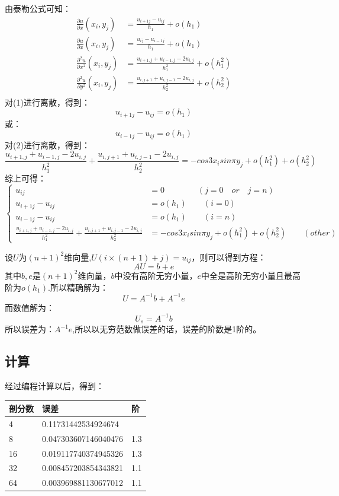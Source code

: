 \documentclass[12pt,a4paper]{article}
\begin{document}
由泰勒公式可知：
\begin{align*}
\frac{\partial u}{\partial x} (x_i,y_j)&=\frac{u_{i+1j}-u_{ij}}{h_1}+o(h_1)\\
\frac{\partial u}{\partial x} (x_i,y_j)&=\frac{u_{ij}-u_{i-1j}}{h_1}+o(h_1)\\
\frac{\partial^2 u}{\partial x^2}(x_i,y_j)&=\frac{u_{i+1,j}+u_{i-1,j}-2u_{i,j}}{h_1^2}+o(h_1^2)\\
\frac{\partial^2 u}{\partial y^2}(x_i,y_j)&=\frac{u_{i,j+1}+u_{i,j-1}-2u_{i,j}}{h_2^2}+o(h_2^2)\\
\end{align*}
对(1)进行离散，得到：
$$
u_{i+1j}-u_{ij}=o(h_1)
$$
或：
$$
u_{i-1j}-u_{ij}=o(h_1)
$$
对(2)进行离散，得到：
$$
\frac{u_{i+1,j}+u_{i-1,j}-2u_{i,j}}{h_1^2}+\frac{u_{i,j+1}+u_{i,j-1}-2u_{i,j}}{h_2^2}=-cos3x_isin\pi y_j+o(h_1^2)+o(h_2^2)
$$
综上可得：
\begin{equation}
\left\{
\begin{aligned}
u_{ij}&=0\qquad \qquad(j=0\quad or \quad j=n)\\
u_{i+1j}-u_{ij}&=o(h_1) \qquad (i=0)\\
u_{i-1j}-u_{ij}&=o(h_1) \qquad( i=n)\\
\frac{u_{i+1,j}+u_{i-1,j}-2u_{i,j}}{h_1^2}+\frac{u_{i,j+1}+u_{i,j-1}-2u_{i,j}}{h_2^2}&=-cos3x_isin\pi y_j+o(h_1^2)+o(h_2^2)\qquad (other)
\end{aligned}
\end{equation}

设$U$为$(n+1)^2$维向量,$U(i\times(n+1)+j)=u_{ij}$，则可以得到方程：
$$
AU=b+e
$$
其中$b,e$是$(n+1)^2$维向量，$b$中没有高阶无穷小量，$e$中全是高阶无穷小量且最高阶为$o(h_1)$.所以精确解为：
$$
U=A^{-1}b+A^{-1}e
$$
而数值解为：
$$
U_s=A^{-1}b
$$
所以误差为：$A^{-1}e$,所以以无穷范数做误差的话，误差的阶数是1阶的。

\subsection{计算}
经过编程计算以后，得到：

\begin{tabular}{l|l|l}
\hline

剖分数 & 误差 & 阶\\
\hline
4 & 0.11731442534924674 &{}\\
\hline
8 & 0.047303607146040476 &{1.3}\\
\hline
16 & 0.019117740374945326 & {1.3}\\
\hline
32 & 0.008457203854343821 & {1.1}\\
\hline
64 & 0.003969881130677012 & {1.1}\\
\hline
\end{tabular}
\end{document}
